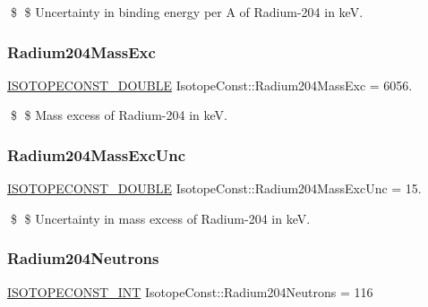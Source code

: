 \$ \$ Uncertainty in binding energy per A of Radium-\/204 in keV. \mbox{\label{group___isotope_const-_radium-_ra204_gab12eaad4ad64374f30868cca52deedb9}} 
\subsubsection{\texorpdfstring{Radium204\+Mass\+Exc}{Radium204MassExc}}
{\footnotesize\ttfamily \mbox{\hyperlink{group___isotope_const-_macros_ga8f45a7272ce02c0b4c65c44636ed719a}{I\+S\+O\+T\+O\+P\+E\+C\+O\+N\+S\+T\+\_\+\+D\+O\+U\+B\+LE}} Isotope\+Const\+::\+Radium204\+Mass\+Exc = 6056.}

\$ \$ Mass excess of Radium-\/204 in keV. \mbox{\label{group___isotope_const-_radium-_ra204_gae3868cacd048e862fc5bf1d90a611903}} 
\subsubsection{\texorpdfstring{Radium204\+Mass\+Exc\+Unc}{Radium204MassExcUnc}}
{\footnotesize\ttfamily \mbox{\hyperlink{group___isotope_const-_macros_ga8f45a7272ce02c0b4c65c44636ed719a}{I\+S\+O\+T\+O\+P\+E\+C\+O\+N\+S\+T\+\_\+\+D\+O\+U\+B\+LE}} Isotope\+Const\+::\+Radium204\+Mass\+Exc\+Unc = 15.}

\$ \$ Uncertainty in mass excess of Radium-\/204 in keV. \mbox{\label{group___isotope_const-_radium-_ra204_ga25d1db50cea6da15549b4e2dc5eb2d14}} 
\subsubsection{\texorpdfstring{Radium204\+Neutrons}{Radium204Neutrons}}
{\footnotesize\ttfamily \mbox{\hyperlink{group___isotope_const-_macros_ga5f18360b3e99483a35c32d789e62621c}{I\+S\+O\+T\+O\+P\+E\+C\+O\+N\+S\+T\+\_\+\+I\+NT}} Isotope\+Const\+::\+Radium204\+Neutrons = 116}

